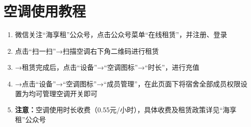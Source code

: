 \section[空调使用教程]{空调使用教程}
\label{air_control}
\begin{enumerate}
    \item 微信关注“海享租”公众号，点击公众号菜单“在线租赁”，并注册、登录
    \item 点击“扫一扫”→扫描空调右下角二维码进行租赁\footnotemark
    \item →租赁完成后，点击“设备”→“空调图标”→“时长”，进行充值
    \item →点击“设备”→“空调图标”→“成员管理”，在此页面下将宿舍全部成员权限设置为均可管理空调开关即可
    \item \textbf{注意：}空调使用时长收费（0.55元/小时），具体收费及租赁政策详见“海享租”公众号
\end{enumerate}

